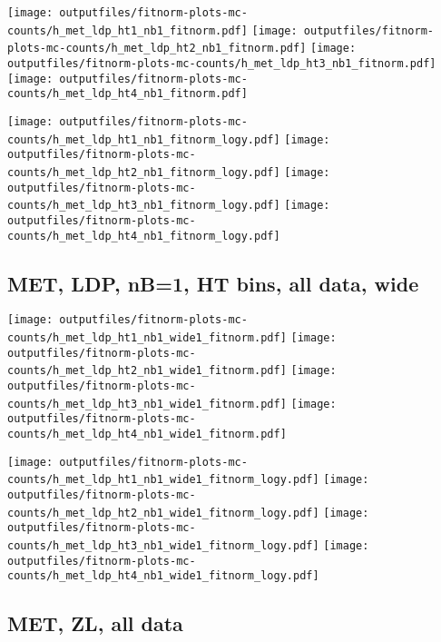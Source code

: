 \documentclass[11pt]{article}
\begin{document}
    \noindent
     \texttt{[image: outputfiles/fitnorm-plots-mc-counts/h\_met\_ldp\_ht1\_nb1\_fitnorm.pdf]}
     \texttt{[image: outputfiles/fitnorm-plots-mc-counts/h\_met\_ldp\_ht2\_nb1\_fitnorm.pdf]}
     \texttt{[image: outputfiles/fitnorm-plots-mc-counts/h\_met\_ldp\_ht3\_nb1\_fitnorm.pdf]}
     \texttt{[image: outputfiles/fitnorm-plots-mc-counts/h\_met\_ldp\_ht4\_nb1\_fitnorm.pdf]}

    \noindent
     \texttt{[image: outputfiles/fitnorm-plots-mc-counts/h\_met\_ldp\_ht1\_nb1\_fitnorm\_logy.pdf]}
     \texttt{[image: outputfiles/fitnorm-plots-mc-counts/h\_met\_ldp\_ht2\_nb1\_fitnorm\_logy.pdf]}
     \texttt{[image: outputfiles/fitnorm-plots-mc-counts/h\_met\_ldp\_ht3\_nb1\_fitnorm\_logy.pdf]}
     \texttt{[image: outputfiles/fitnorm-plots-mc-counts/h\_met\_ldp\_ht4\_nb1\_fitnorm\_logy.pdf]}


    \clearpage
     \subsection{ MET, LDP, nB=1, HT bins, all data, wide}

    \noindent
     \texttt{[image: outputfiles/fitnorm-plots-mc-counts/h\_met\_ldp\_ht1\_nb1\_wide1\_fitnorm.pdf]}
     \texttt{[image: outputfiles/fitnorm-plots-mc-counts/h\_met\_ldp\_ht2\_nb1\_wide1\_fitnorm.pdf]}
     \texttt{[image: outputfiles/fitnorm-plots-mc-counts/h\_met\_ldp\_ht3\_nb1\_wide1\_fitnorm.pdf]}
     \texttt{[image: outputfiles/fitnorm-plots-mc-counts/h\_met\_ldp\_ht4\_nb1\_wide1\_fitnorm.pdf]}

    \noindent
     \texttt{[image: outputfiles/fitnorm-plots-mc-counts/h\_met\_ldp\_ht1\_nb1\_wide1\_fitnorm\_logy.pdf]}
     \texttt{[image: outputfiles/fitnorm-plots-mc-counts/h\_met\_ldp\_ht2\_nb1\_wide1\_fitnorm\_logy.pdf]}
     \texttt{[image: outputfiles/fitnorm-plots-mc-counts/h\_met\_ldp\_ht3\_nb1\_wide1\_fitnorm\_logy.pdf]}
     \texttt{[image: outputfiles/fitnorm-plots-mc-counts/h\_met\_ldp\_ht4\_nb1\_wide1\_fitnorm\_logy.pdf]}




     \subsection{ MET, ZL, all data}
\end{document}
